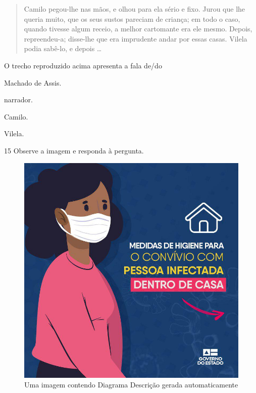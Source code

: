 \begin{quote}
Camilo pegou-lhe nas mãos, e olhou para ela sério e fixo. Jurou que lhe
queria muito, que os seus sustos pareciam de criança; em todo o caso,
quando tivesse algum receio, a melhor cartomante era ele mesmo. Depois,
repreendeu-a; disse-lhe que era imprudente andar por essas casas. Vilela
podia sabê-lo, e depois \ldots
\end{quote}


O trecho reproduzido acima apresenta a fala de/do

\begin{escolha}
  \item Machado de Assis.

  \item narrador.

  \item Camilo.

  \item Vilela.
\end{escolha}



\num{15} Observe a imagem e responda à pergunta.

\begin{figure}
\centering
\includegraphics[width=\textwidth]{./imgQ4PORT/media/image5.jpeg}
\caption{Uma imagem contendo Diagrama Descrição gerada automaticamente}
\end{figure}

